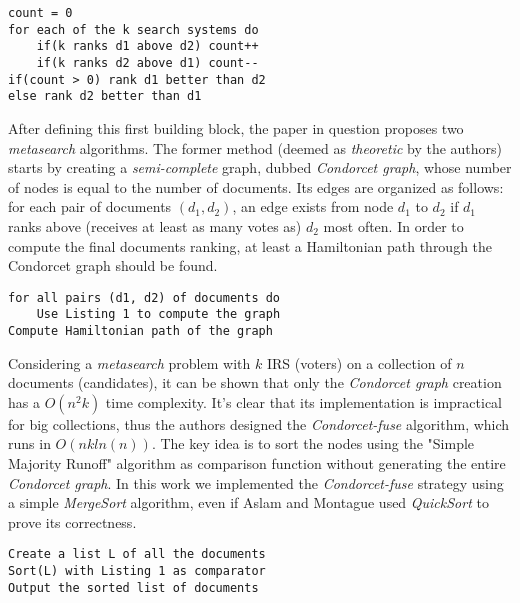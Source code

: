 \documentclass[letterpaper, 10 pt, conference]{ieeeconf}  %
\begin{document}
\renewcommand*\thelstnumber{\arabic{lstnumber}:}

\captionsetup[lstlisting]{labelfont=bf,singlelinecheck=off,labelsep=space}

\begin{lstlisting}[caption={Simple Majority Runoff}]
count = 0
for each of the k search systems do
    if(k ranks d1 above d2) count++
    if(k ranks d2 above d1) count--
if(count > 0) rank d1 better than d2
else rank d2 better than d1
\end{lstlisting}


After defining this first building block, the paper in question proposes two \textit{metasearch} algorithms. The former method (deemed as \textit{theoretic} by the authors) starts by creating a \textit{semi-complete} graph, dubbed \textit{Condorcet graph}, whose number of nodes is equal to the number of documents. \newline Its edges are organized as follows: for each pair of documents $(d_1, d_2)$, an edge exists from node $d_1$ to $d_2$ if $d_1$ ranks above (receives at least as many votes as) $d_2$ most often. In order to compute the final documents ranking, at least a Hamiltonian path through the Condorcet graph should be found.

\begin{lstlisting}[caption={Theoretic Condorcet Metasearch}]
for all pairs (d1, d2) of documents do
    Use Listing 1 to compute the graph
Compute Hamiltonian path of the graph
\end{lstlisting}

Considering a \textit{metasearch} problem with $k$ IRS (voters) on a collection of $n$ documents (candidates), it can be shown that only the \textit{Condorcet graph} creation has a $O(n^{2}k)$ time complexity. It's clear that its implementation is impractical for big collections, thus the authors designed the \textit{Condorcet-fuse} algorithm, which runs in $O(nkln(n))$. The key idea is to sort the nodes using the "Simple Majority Runoff" algorithm as comparison function without generating the entire \textit{Condorcet graph}. In this work we implemented the \textit{Condorcet-fuse} strategy using a simple \textit{MergeSort} algorithm, even if Aslam and Montague used \textit{QuickSort} to prove its correctness. 

\begin{lstlisting}[caption={Condorcet-fuse}]
Create a list L of all the documents
Sort(L) with Listing 1 as comparator
Output the sorted list of documents
\end{lstlisting}
\end{document}
